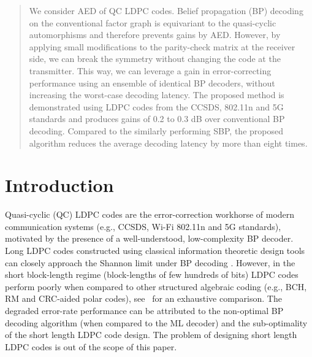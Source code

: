 \documentclass[conference]{IEEEtran}
\newcommand\new[1]{#1}
\begin{document}
\begin{NoHyper}
\begin{abstract}
We consider \ac{AED} of \ac{QC} \ac{LDPC} codes. Belief propagation (BP) decoding on the conventional factor graph is equivariant to the quasi-cyclic automorphisms and therefore prevents gains by AED. However, by applying small modifications to the parity-check matrix at the receiver side, we can break the symmetry without changing the code at the transmitter. This way, we can leverage a gain in error-correcting performance using an ensemble of identical \ac{BP} decoders, without increasing the worst-case decoding latency. The proposed method is demonstrated using \ac{LDPC} codes from the CCSDS, 802.11n and 5G standards and produces gains of 0.2 to 0.3 dB over conventional \ac{BP} decoding. \new{Compared to the similarly performing \ac{SBP}, the proposed algorithm reduces the average decoding latency by more than eight times.}
\end{abstract}
\acresetall

\section{Introduction}

Quasi-cyclic (QC) \ac{LDPC} codes are the error-correction workhorse of modern communication systems (e.g., CCSDS, Wi-Fi 802.11n and 5G \cite{5GLDPC} standards), motivated by the presence of a well-understood, low-complexity \ac{BP} decoder.
Long \ac{LDPC} codes constructed using classical information theoretic design tools can closely approach the Shannon limit under \ac{BP} decoding \cite{CapLDPC}. 
However, in the short block-length regime (block-lengths of few hundreds of bits) \ac{LDPC} codes perform poorly when compared to other structured algebraic coding (e.g., \ac{BCH}, \ac{RM} and \ac{CRC}-aided polar codes), see~\cite{liva2016} for an exhaustive comparison.
The degraded error-rate performance can be attributed to the non-optimal \ac{BP} decoding algorithm (when compared to the \ac{ML} decoder) and the sub-optimality of the short length \ac{LDPC} code design.
The problem of designing short length \ac{LDPC} codes is out of the scope of this paper. 


\end{NoHyper}
\end{document}
